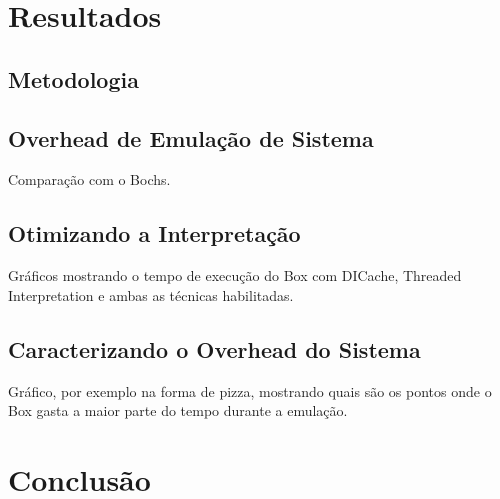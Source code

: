 \documentclass[11pt,twoside]{article}
\begin{document}
\section{Resultados} \label{sec:resultados}

\subsection{Metodologia}

\subsection{Overhead de Emulação de Sistema}

Comparação com o Bochs.

\subsection{Otimizando a Interpretação}

Gráficos mostrando o tempo de execução do Box com DICache, Threaded Interpretation
e ambas as técnicas habilitadas.

\subsection{Caracterizando o Overhead do Sistema}

Gráfico, por exemplo na forma de pizza, mostrando quais são os pontos onde o Box
gasta a maior parte do tempo durante a emulação.







\section{Conclusão}  \label{sec:conclusao}




\newpage

\end{document}
